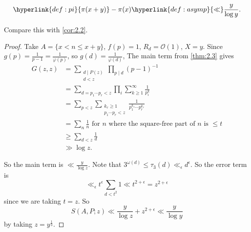 \documentclass{article}
\newcommand{\1}{\mathbbm{1}}
\newcommand{\bigO}{\mathcal{O}}
\begin{document}
\begin{ncor}\label{cor:2.4}
  \begin{equation*}
    \hyperlink{def:pi}{\pi(x+y)} - \pi(x) \hyperlink{def:asymp}{\ll} \frac{y}{\log y}.
  \end{equation*}
\end{ncor}
Compare this with \cref{cor:2.2}.
\begin{proof}
  Take $A = \{x < n \leq x+y\}$, $f(p) = 1$, $R_d = \bigO(1)$, $X = y$.
  Since $g(p) = \frac{1}{p-1} = \frac{1}{\varphi(p)}$, so $g(d) = \frac{1}{\varphi(d)}$,
  The main term from \cref{thm:2.3} gives
  \begin{align*}
    G(z,z) &= \sum_{\substack{d \mid P(z) \\ d < z}} \prod_{p \mid d} (p-1)^{-1} \\
           &= \sum_{d = p_1 \dotsm p_r < z} \prod_i \sum_{k \geq 1}^\infty \frac{1}{p_i^k} \\
           &= \sum_{p < z} \sum_{\substack{k_r \geq 1 \\ p_1 \dotsm p_r < z}} \frac{1}{p_1^{k_1} \dotsm p_r^{k_r}} \\
           &= \sum_{n} \frac{1}{n} \text{ for $n$ where the square-free part of $n$ is $\leq t$}\\
           &\geq \sum_{d<z} \frac{1}{d} \\
           &\gg \log z.
  \end{align*}

  So the main term is $\ll \frac{y}{\log z}$.
  Note that $3^{\omega(d)} \leq \tau_3(d) \ll_\epsilon d^\epsilon$. So the error term is
  \begin{equation*}
    \ll_\epsilon t^\epsilon \sum_{d < t^2} 1 \ll t^{2 + \epsilon} = z^{2+\epsilon}
  \end{equation*}
  since we are taking $t = z$.
  So
  \begin{equation*}
    S(A,P;z) \ll \frac{y}{\log z} + z^{2+\epsilon} \ll \frac{y}{\log y}
  \end{equation*}
  by taking $z = y^{\frac{1}{3}}$.
\end{proof}
\end{document}
